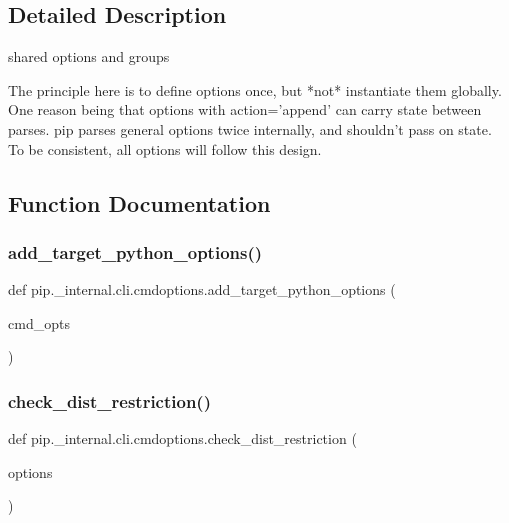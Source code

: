 \subsection{Detailed Description}
\begin{DoxyVerb}shared options and groups

The principle here is to define options once, but *not* instantiate them
globally. One reason being that options with action='append' can carry state
between parses. pip parses general options twice internally, and shouldn't
pass on state. To be consistent, all options will follow this design.
\end{DoxyVerb}
 

\subsection{Function Documentation}
\mbox{\label{namespacepip_1_1__internal_1_1cli_1_1cmdoptions_ad57144ab587a6d6c283cbd69d8823be9}} 
\subsubsection{\texorpdfstring{add\+\_\+target\+\_\+python\+\_\+options()}{add\_target\_python\_options()}}
{\footnotesize\ttfamily def pip.\+\_\+internal.\+cli.\+cmdoptions.\+add\+\_\+target\+\_\+python\+\_\+options (\begin{DoxyParamCaption}\item[{}]{cmd\+\_\+opts }\end{DoxyParamCaption})}

\mbox{\label{namespacepip_1_1__internal_1_1cli_1_1cmdoptions_a3085fdde429b762187382eba782d5b24}} 
\subsubsection{\texorpdfstring{check\+\_\+dist\+\_\+restriction()}{check\_dist\_restriction()}}
{\footnotesize\ttfamily def pip.\+\_\+internal.\+cli.\+cmdoptions.\+check\+\_\+dist\+\_\+restriction (\begin{DoxyParamCaption}\item[{}]{options }\end{DoxyParamCaption})}

